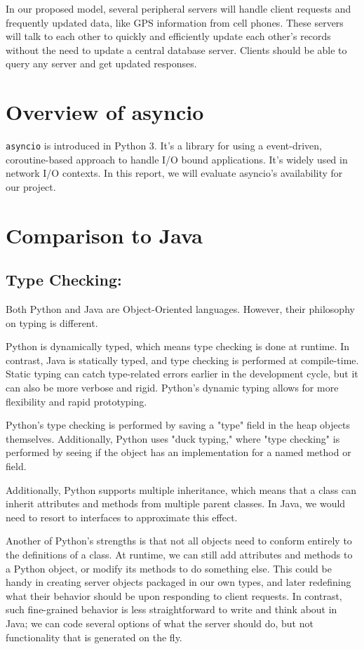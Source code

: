 In our proposed model, several peripheral servers will handle client requests
and frequently updated data, like GPS information from cell phones. These 
servers will talk to each other to quickly and efficiently update each other's records
without the need to update a central database server. Clients should be able to
query any server and get updated responses.

\section{Overview of asyncio}
\texttt{asyncio} is introduced in Python 3. It's a library for using a event-driven, coroutine-based approach to handle I/O bound applications. It's widely used in network I/O contexts. In this report, we will evaluate asyncio's availability for our project.

\section{Comparison to Java}

\subsection{Type Checking:}
Both Python and Java are Object-Oriented languages. However, their philosophy on typing is different.

Python is dynamically typed, which means type checking is done at runtime. In contrast, Java is statically typed, and type checking is performed at compile-time. Static typing can catch type-related errors earlier in the development cycle, but it can also be more verbose and rigid. Python's dynamic typing allows for more flexibility and rapid prototyping.

Python's type checking is performed by saving a "type" field in the heap objects themselves.
Additionally, Python uses "duck typing," where "type checking" is performed by seeing if the object has an implementation for a named method or field. 

Additionally, Python supports multiple inheritance, which means that a class can inherit attributes and methods from multiple parent classes. In Java, we would need to resort to interfaces to approximate this effect.

Another of Python's strengths is that not all objects need to conform entirely to the definitions of a class. At runtime, we can still add attributes and methods to a Python object, or modify its methods to do something else. This could be handy in creating server objects packaged in our own types, and later redefining what their behavior should be upon responding to client requests. In contrast, such fine-grained behavior is less straightforward to write and think about in Java; we can code several options of what the server should do, but not functionality that is generated on the fly.


